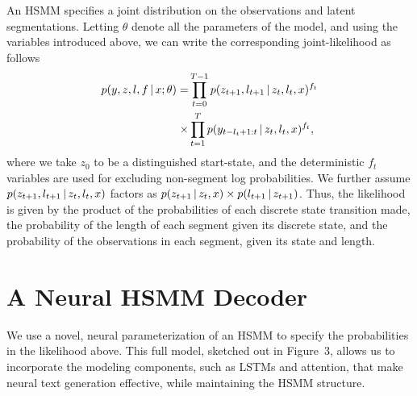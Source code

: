 \documentclass[11pt,a4paper]{article}
\begin{document}
An HSMM specifies a joint distribution on the observations and latent segmentations. Letting $\theta$ denote all the parameters of the model, and using the variables introduced above, we can write the corresponding joint-likelihood as follows
 \begin{align*}
p(y, z, l, f \,|\, x; \theta) = &\prod_{t=0}^{T-1} p(z_{t+1}, l_{t+1} \,|\, z_{t}, l_{t}, x)^{f_t} \\
\times &\prod_{t=1}^T p(y_{t-l_t+1:t} \,|\, z_t, l_t, x)^{f_t},
\end{align*}
where we take $z_0$ to be a distinguished start-state, and the deterministic $f_t$ variables are used for excluding non-segment log probabilities.
We further assume $p(z_{t+1}, l_{t+1} \,|\, z_{t}, l_{t}, x)$ factors as $p(z_{t+1} \,|\, z_{t}, x) \times p(l_{t+1} \,|\, z_{t+1})$. Thus, the likelihood is given by the product of the probabilities of each discrete state transition made, the probability of the length of each segment given its discrete state, and the probability of the observations in each segment, given its state and length.




\section{A Neural HSMM Decoder}
\label{sec:model}
We use a novel, neural parameterization of an HSMM
to specify the probabilities in the likelihood above. %
This full model, sketched out in Figure~3, allows us to incorporate
the modeling components, such as LSTMs and attention, that make neural text generation
effective, while maintaining the HSMM structure.
\end{document}
